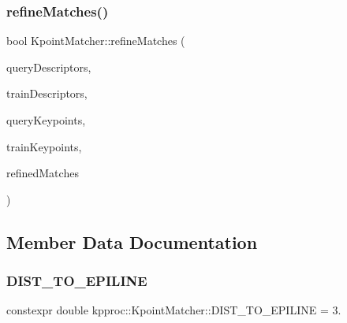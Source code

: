\subsubsection{\texorpdfstring{refine\+Matches()}{refineMatches()}}
{\footnotesize\ttfamily bool Kpoint\+Matcher\+::refine\+Matches (\begin{DoxyParamCaption}\item[{const cv\+::\+Mat \&}]{query\+Descriptors,  }\item[{const cv\+::\+Mat \&}]{train\+Descriptors,  }\item[{const std\+::vector$<$ cv\+::\+Key\+Point $>$ \&}]{query\+Keypoints,  }\item[{const std\+::vector$<$ cv\+::\+Key\+Point $>$ \&}]{train\+Keypoints,  }\item[{std\+::vector$<$ cv\+::\+D\+Match $>$ \&}]{refined\+Matches }\end{DoxyParamCaption})\hspace{0.3cm}{\ttfamily [private]}}



\subsection{Member Data Documentation}
\mbox{\label{classkpproc_1_1KpointMatcher_a1efd51083ded96127c34697340e5e92e}} 
\subsubsection{\texorpdfstring{D\+I\+S\+T\+\_\+\+T\+O\+\_\+\+E\+P\+I\+L\+I\+NE}{DIST\_TO\_EPILINE}}
{\footnotesize\ttfamily constexpr double kpproc\+::\+Kpoint\+Matcher\+::\+D\+I\+S\+T\+\_\+\+T\+O\+\_\+\+E\+P\+I\+L\+I\+NE = 3.\hspace{0.3cm}{\ttfamily [static]}}

\mbox{\label{classkpproc_1_1KpointMatcher_a082b2988b8e0381f2286dcaa1725a8db}} 
